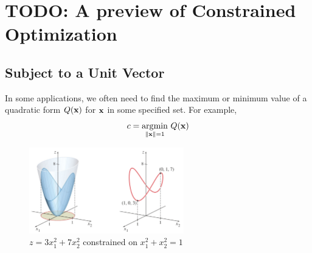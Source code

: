 \section{TODO: A preview of Constrained Optimization}
    \subsection{Subject to a Unit Vector}
    In some applications, we often need to find the maximum or minimum value of a quadratic form $Q(\mathbf{x)}$ for $\mathbf{x}$ in some specified set. For example,
    \begin{equation*}
        c = \underset{\lVert \mathbf{x} \rVert = 1}{\operatorname*{arg\!\min}}\ Q({\mathbf{x}})
    \end{equation*}
    
    \begin{figure}[ht]
    \centering
    \includegraphics[width=0.6\textwidth]{images/constrained-1.jpg}
    \caption{$z = 3x_1^2 + 7x_2^2$ constrained on $x_1^2+x_2^2 = 1$}
    \end{figure}


